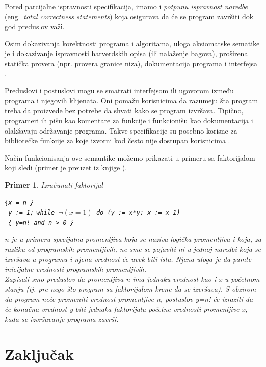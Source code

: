 \documentclass[a4paper]{article}
\newtheorem{primer}{Primer}[section]
\begin{document}
{Pored parcijalne ispravnosti specifikacija, imamo i \textit {potpunu ispravnost naredbe } (eng.~{\em  total correctness statements}) koja osigurava da će se program završiti dok god preduslov važi.

Osim dokazivanja korektnosti programa i algoritama, uloga aksiomatske sematike je i dokazivanje ispravnosti harverdskih opisa (ili nalaženje bagova), proširena statička provera (npr. provera granice niza), dokumentacija programa i interfejsa  \cite{bec} . 

Preduslovi i postuslovi mogu se smatrati interfejsom ili ugovorom između programa i njegovih klijenata. Oni pomažu korisnicima da razumeju šta program treba da proizvede bez potrebe da shvati kako se program izvršava. Tipično, programeri ih pišu kao komentare za funkcije i
funkcionišu kao dokumentacija i olakšavaju održavanje programa. Takve specifikacije su posebno
korisne za bibliotečke funkcije za koje izvorni kod često nije dostupan korisnicima \cite{adrian}.

Način funkcionisanja ove semantike možemo prikazati u primeru sa faktorijalom koji sledi (primer je preuzet iz knjige \cite{nielson} ). \\
\begin{primer} Izračunati faktorijal
\begin{center}


\texttt{\{x = n \}}   \\
\texttt{ y := 1;} 
 \texttt{while $ \neg(x=1) $   do  (y := x*y; x := x-1) }\\
\texttt{ \{ y=n! and  n > 0 \}  } \\
\end{center}
n je u primeru specijalna promenljiva koja se naziva logička promenljiva i koja, za razliku od programskih promenljivih, ne sme se pojaviti ni u jednoj naredbi koja se izvršava u programu i njena vrednost će uvek biti ista. Njena uloga je da pamte inicijalne vrednosti programskih promenljivih. \\
 Zapisali smo  preduslov da promenljiva n ima jednaku vrednost kao i x u početnom stanju (tj. pre nego što program sa faktorijalom krene da se izvršava). S obzirom da program neće promeniti vrednost promenljive n, postuslov y=n! će izraziti da će konačna vrednost y  biti jednaka faktorijalu početne vrednosti promenljive x, kada se izvršavanje programa završi. \\

\end{primer}

\section{Zaključak}
\label{sec:zakljucak}


}
\end{document}

